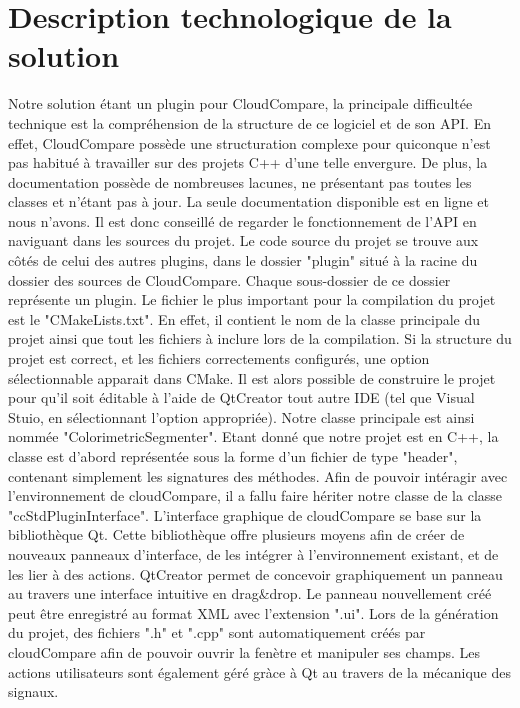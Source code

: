 \documentclass[12pt,titlepage,french]{article}
\begin{document}
\section{Description technologique de la solution}
Notre solution étant un plugin pour CloudCompare, la principale difficultée technique est la compréhension de la structure de ce logiciel et de son API.
En effet, CloudCompare possède une structuration complexe pour quiconque n'est pas habitué à travailler sur des projets C++ d'une telle envergure.
De plus, la documentation possède de nombreuses lacunes, ne présentant pas toutes les classes et n'étant pas à jour. La seule documentation disponible est en ligne et nous n'avons.
Il est donc conseillé de regarder le fonctionnement de l'API en naviguant dans les sources du projet.
Le code source du projet se trouve aux côtés de celui des autres plugins, dans le dossier "plugin" situé à la racine du dossier des sources de CloudCompare.
Chaque sous-dossier de ce dossier représente un plugin.\newline
Le fichier le plus important pour la compilation du projet est le "CMakeLists.txt". En effet, il contient le nom de la classe principale du projet ainsi que tout les fichiers à inclure lors de la compilation.
Si la structure du projet est correct, et les fichiers correctements configurés, une option sélectionnable apparait dans CMake. 
Il est alors possible de construire le projet pour qu'il soit éditable à l'aide de QtCreator tout autre IDE (tel que Visual Stuio, en sélectionnant l'option appropriée).
Notre classe principale est ainsi nommée "ColorimetricSegmenter". Etant donné que notre projet est en C++, la classe est d'abord représentée sous la forme d'un fichier de type "header", contenant simplement les signatures des méthodes. 
Afin de pouvoir intéragir avec l'environnement de cloudCompare, il a fallu faire hériter notre classe de la classe "ccStdPluginInterface".\newline
L'interface graphique de cloudCompare se base sur la bibliothèque Qt. Cette bibliothèque offre plusieurs moyens afin de créer de nouveaux panneaux d'interface, de les intégrer à l'environnement existant, et de les lier à des actions.
QtCreator permet de concevoir graphiquement un panneau au travers une interface intuitive en drag\&drop. Le panneau nouvellement créé peut être enregistré au format XML avec l'extension ".ui".
Lors de la génération du projet, des fichiers ".h" et ".cpp" sont automatiquement créés par cloudCompare afin de pouvoir ouvrir la fenètre et manipuler ses champs.\newline
Les actions utilisateurs sont également géré gràce à Qt au travers de la mécanique des signaux.
\end{document}
